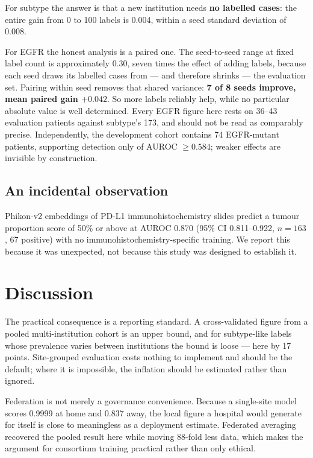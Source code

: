 \documentclass[11pt,a4paper]{article}
\begin{document}
For subtype the answer is that a new institution needs \textbf{no labelled cases}: the entire
gain from 0 to 100 labels is 0.004, within a seed standard deviation of 0.008.

For EGFR the honest analysis is a paired one. The seed-to-seed range at fixed label count is
approximately 0.30, seven times the effect of adding labels, because each seed draws its
labelled cases from --- and therefore shrinks --- the evaluation set. Pairing within seed removes
that shared variance: \textbf{7 of 8 seeds improve, mean paired gain $+0.042$}. So more labels
reliably help, while no particular absolute value is well determined. Every EGFR figure here
rests on 36--43 evaluation patients against subtype's 173, and should not be read as comparably
precise. Independently, the development cohort contains 74 EGFR-mutant patients, supporting
detection only of AUROC $\geq 0.584$; weaker effects are invisible by construction.

\subsection{An incidental observation}

Phikon-v2 embeddings of PD-L1 immunohistochemistry slides predict a tumour proportion score of
50\% or above at AUROC 0.870 (95\% CI 0.811--0.922, $n = 163$, 67 positive) with no
immunohistochemistry-specific training. We report this because it was unexpected, not because
this study was designed to establish it.

\section{Discussion}

The practical consequence is a reporting standard. A cross-validated figure from a pooled
multi-institution cohort is an upper bound, and for subtype-like labels whose prevalence varies
between institutions the bound is loose --- here by 17 points. Site-grouped evaluation costs
nothing to implement and should be the default; where it is impossible, the inflation should be
estimated rather than ignored.

Federation is not merely a governance convenience. Because a single-site model scores 0.9999 at
home and 0.837 away, the local figure a hospital would generate for itself is close to
meaningless as a deployment estimate. Federated averaging recovered the pooled result here
while moving 88-fold less data, which makes the argument for consortium training practical
rather than only ethical.
\end{document}
